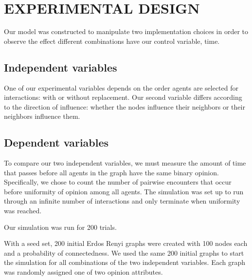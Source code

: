 
\section{EXPERIMENTAL DESIGN}

Our model was constructed to manipulate two implementation choices in order
to observe the effect different combinations have our control variable, time.

\subsection{Independent variables}

One of our experimental variables depends on the order agents are selected 
for interactions: with or without replacement. Our second variable differs 
according to the direction of influence: whether the nodes influence their 
neighbors or their neighbors influence them.

\subsection{Dependent variables}

To compare our two independent variables, we must measure the amount of time that
passes before all agents in the graph have the same binary opinion. Specifically,
we chose to count the number of pairwise encounters that occur before uniformity
of opinion among all agents. The simulation was set up to run through an infinite 
number of interactions and only terminate when uniformity was reached.

Our simulation was run for 200 trials. 

With a seed set, 200 initial Erdos Renyi graphs were created with 100 nodes each
and a       probability of connectedness. We used the same 200 initial graphs to
start the simulation for all combinations of the two independent variables. Each
graph was randomly assigned one of two opinion attributes.





